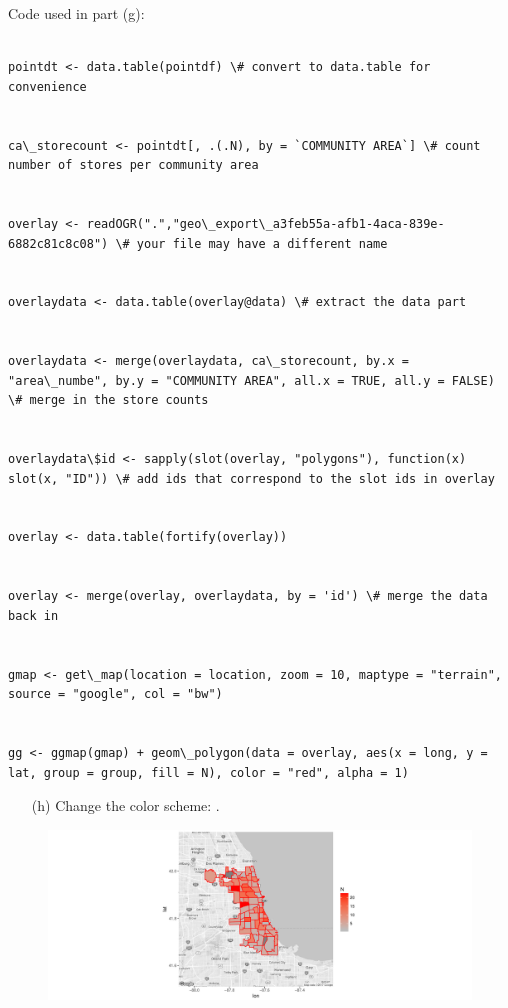 \documentclass{beamer}
\begin{document}
\begin{frame}[allowframebreaks]
	\footnotesize
	Code used in part (g):\tiny
	\begin{verbatim}
	
pointdt <- data.table(pointdf) \# convert to data.table for convenience


ca\_storecount <- pointdt[, .(.N), by = `COMMUNITY AREA`] \# count number of stores per community area


overlay <- readOGR(".","geo\_export\_a3feb55a-afb1-4aca-839e-6882c81c8c08") \# your file may have a different name


overlaydata <- data.table(overlay@data) \# extract the data part


overlaydata <- merge(overlaydata, ca\_storecount, by.x = "area\_numbe", by.y = "COMMUNITY AREA", all.x = TRUE, all.y = FALSE) \# merge in the store counts


overlaydata\$id <- sapply(slot(overlay, "polygons"), function(x) slot(x, "ID")) \# add ids that correspond to the slot ids in overlay


overlay <- data.table(fortify(overlay))


overlay <- merge(overlay, overlaydata, by = 'id') \# merge the data back in


gmap <- get\_map(location = location, zoom = 10, maptype = "terrain", source = "google", col = "bw")


gg <- ggmap(gmap) + geom\_polygon(data = overlay, aes(x = long, y = lat, group = group, fill = N), color = "red", alpha = 1)

	\end{verbatim}	

	\begin{myexccont}
	\fontsize{9pt}{11}\selectfont
		\begin{enumerate}[(a)]
            \item[(h)]
			Change the color scheme: .
		\end{enumerate}
	\addtocounter{exccounter}{1}
	\end{myexccont}

	\begin{figure}
	\centering
	\includegraphics[width=1.1\textwidth]{figures/Grocer_stores_shaded2}
	\label{Fig: map}
	\end{figure}
	


\end{frame}
\end{document}

